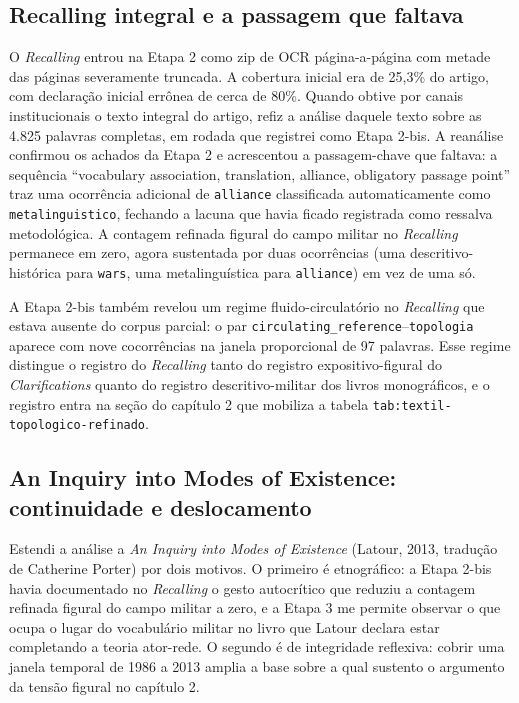 \subsection{Recalling integral e a passagem que faltava}

O \emph{Recalling} entrou na Etapa 2 como zip de OCR página-a-página com metade das páginas severamente truncada. A cobertura inicial era de 25,3\% do artigo, com declaração inicial errônea de cerca de 80\%. Quando obtive por canais institucionais o texto integral do artigo, refiz a análise daquele texto sobre as 4.825 palavras completas, em rodada que registrei como Etapa 2-bis. A reanálise confirmou os achados da Etapa 2 e acrescentou a passagem-chave que faltava: a sequência \enquote{vocabulary association, translation, alliance, obligatory passage point} traz uma ocorrência adicional de \texttt{alliance} classificada automaticamente como \texttt{metalinguistico}, fechando a lacuna que havia ficado registrada como ressalva metodológica. A contagem refinada figural do campo militar no \emph{Recalling} permanece em zero, agora sustentada por duas ocorrências (uma descritivo-histórica para \texttt{wars}, uma metalinguística para \texttt{alliance}) em vez de uma só.

A Etapa 2-bis também revelou um regime fluido-circulatório no \emph{Recalling} que estava ausente do corpus parcial: o par \texttt{circulating\_reference}--\texttt{topologia} aparece com nove cocorrências na janela proporcional de 97 palavras. Esse regime distingue o registro do \emph{Recalling} tanto do registro expositivo-figural do \emph{Clarifications} quanto do registro descritivo-militar dos livros monográficos, e o registro entra na seção do capítulo 2 que mobiliza a tabela \texttt{tab:textil-topologico-refinado}.

\subsection{An Inquiry into Modes of Existence: continuidade e deslocamento}

Estendi a análise a \emph{An Inquiry into Modes of Existence} (Latour, 2013, tradução de Catherine Porter) por dois motivos. O primeiro é etnográfico: a Etapa 2-bis havia documentado no \emph{Recalling} o gesto autocrítico que reduziu a contagem refinada figural do campo militar a zero, e a Etapa 3 me permite observar o que ocupa o lugar do vocabulário militar no livro que Latour declara estar completando a teoria ator-rede. O segundo é de integridade reflexiva: cobrir uma janela temporal de 1986 a 2013 amplia a base sobre a qual sustento o argumento da tensão figural no capítulo 2.

